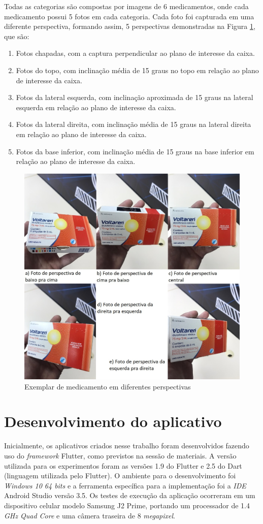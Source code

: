  Todas as categorias são compostas por imagens de 6 medicamentos, onde cada medicamento possui 5 fotos em cada categoria. Cada foto foi capturada em uma diferente perspectiva, formando assim, 5 perspectivas demonstradas na Figura \ref{perspectiva}, que são:
   \begin{enumerate}
   \item Fotos chapadas, com a captura perpendicular ao plano de interesse da caixa.
   \item Fotos do topo, com inclinação média de 15 graus no topo em relação ao plano de interesse da caixa.
    \item Fotos da lateral esquerda, com inclinação aproximada de 15 graus na lateral esquerda em relação ao plano de interesse da caixa.
    \item Fotos da lateral direita, com inclinação média de 15 graus na lateral direita em relação ao plano de interesse da caixa.
    \item Fotos da base inferior, com inclinação média de 15 graus na base inferior em relação ao plano de interesse da caixa.
 \end{enumerate}
  \begin{figure}[h!]
	\centering
	\includegraphics[height=0.70\textwidth]{Imagens/perspectiva.jpg} 
	\caption[Exemplar de medicamento em diferentes perspectivas.]{Exemplar de medicamento em diferentes perspectivas}
	\label{perspectiva}
\end{figure}
 
 



\section{Desenvolvimento do aplicativo}
Inicialmente, os aplicativos criados nesse trabalho foram desenvolvidos fazendo uso do \textit{framework} Flutter, como previstos na sessão de materiais. A versão utilizada para os experimentos foram as versões 1.9 do Flutter e 2.5 do Dart (linguagem utilizada pelo Flutter). O ambiente para o desenvolvimento foi \textit{Windows 10 64 bits} e a ferramenta específica para a implementação foi a \textit{IDE} Android Studio versão 3.5.
Os testes de execução da aplicação ocorreram em um dispositivo celular  modelo Samsung J2 Prime, portando um processador de 1.4 \textit{GHz Quad Core} e uma câmera traseira de 8 \textit{megapixel}. 

